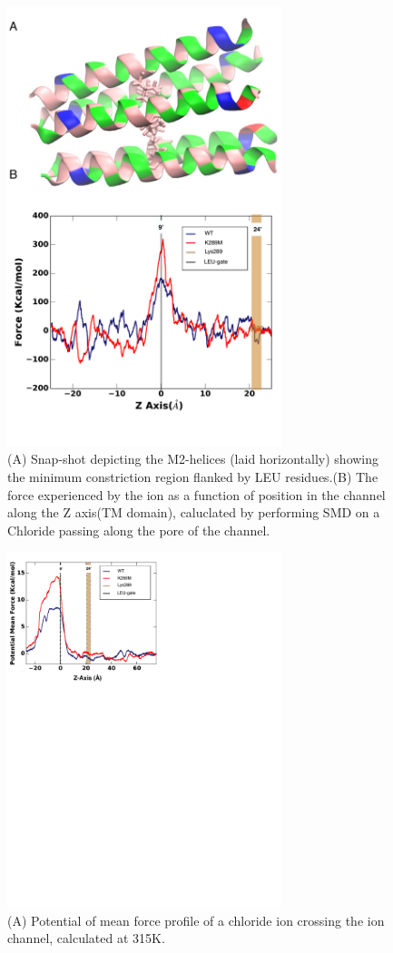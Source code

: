 \documentclass[9pt,onecolumn,oneside,lineno]{pnas-new}
\begin{document}
\begin{figure}
\begin{center}
\includegraphics[width = 80mm]{figures_2/sup1_SMD}
\end{center}
\caption{(A) Snap-shot depicting the M2-helices (laid horizontally) showing the minimum constriction region flanked by LEU residues.(B) The force experienced by the ion as a function of position in the channel along the Z axis(TM domain), caluclated by performing SMD on a Chloride passing along the pore of the channel.}
\label{fig:SMD}
\end{figure}

\begin{figure}
\begin{center}
\includegraphics[width = 80mm]{figures_2/pillar_4_ABF_2_sup}
\end{center}
\caption{(A)  Potential of mean force profile of a chloride ion crossing the ion channel, calculated at 315K.}
\label{fig:SMD}
\end{figure}
\end{document}
